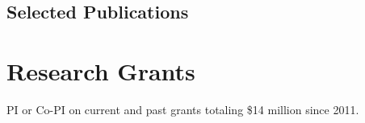 \documentclass[10pt]{article}
\begin{document}
  \subsection[Selected Publications]{Selected Publications}
    \begin{refsection}
    \nocite{vandenbergh:2017:beyond.politics,elsawah:2020:grand.challenges,gilligan:2020:assessing.private.governance,nielsen:2020:mitigation.analysis,gilligan:2021:collaboration,gilligan:2018:water.conservation,gilligan:2018:carrots.sticks,gilligan:2014:dietz:2009:behavioral.wedge,ding:2021:Cape-Town}
    \printbibliography[heading=none]
    \end{refsection}

	\section{Research Grants}
	PI or Co-PI on current and past grants totaling \$14 million since 2011.
\end{document}
